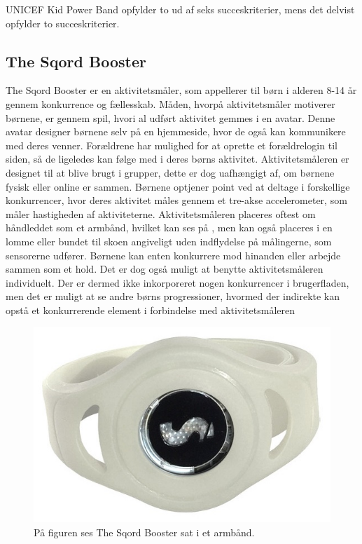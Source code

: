 UNICEF Kid Power Band opfylder to ud af seks succeskriterier, mens det delvist opfylder to succeskriterier.

\subsection{The Sqord Booster}
The Sqord Booster er en aktivitetsmåler, som appellerer til børn i alderen 8-14 år gennem konkurrence og fællesskab. Måden, hvorpå aktivitetsmåler motiverer børnene, er gennem spil, hvori al udført aktivitet gemmes i en avatar. Denne avatar designer børnene selv på en hjemmeside, hvor de også kan kommunikere med deres venner. Forældrene har mulighed for at oprette et forældrelogin til siden, så de ligeledes kan følge med i deres børns aktivitet. Aktivitetsmåleren er designet til at blive brugt i grupper, dette er dog uafhængigt af, om børnene fysisk eller online er sammen. \citep{Sqord_family2015} \newline
Børnene optjener point ved at deltage i forskellige konkurrencer, hvor deres aktivitet måles gennem et tre-akse accelerometer, som måler hastigheden af aktiviteterne. Aktivitetsmåleren placeres oftest om håndleddet som et armbånd, hvilket kan ses på , men kan også placeres i en lomme eller bundet til skoen angiveligt uden indflydelse på målingerne, som sensorerne udfører. \citep{Sqord_family2015} \newline Børnene kan enten konkurrere mod hinanden eller arbejde sammen som et hold. Det er dog også muligt at benytte aktivitetsmåleren individuelt. Der er dermed ikke inkorporeret nogen konkurrencer i brugerfladen, men det er muligt at se andre børns progressioner, hvormed der indirekte kan opstå et konkurrerende element i forbindelse med aktivitetsmåleren\citep{Sqord_family2015,Sqord_group2015}
\begin{figure}[H]
	\centering
	\includegraphics[scale=0.31]{figures/aProblemanalyse/sqord.JPG}
	\caption{På figuren ses The Sqord Booster sat i et armbånd. \citep{Sqord2016}}
	\label{fig:sqord}
\end{figure}
